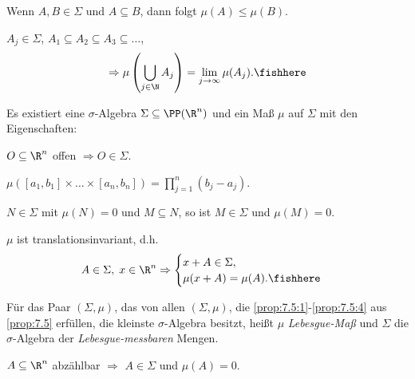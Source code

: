 \begin{cor}
\label{prop:7.4}
\begin{propenum}
\item Wenn $A,B\in\Sigma$ und $A\subseteq B$, dann folgt $\mu(A)\le\mu(B)$.
\item $A_j\in\Sigma$, $A_1\subseteq A_2\subseteq A_3 \subseteq \ldots$,
\begin{align*}
\Rightarrow \mu\left(\bigcup_{j\in\N} A_j\right) = \lim\limits_{j\to\infty}
\mu(A_j).\fishhere
\end{align*}
\end{propenum}
\end{cor}

\begin{prop}
\label{prop:7.5}
Es existiert eine $\sigma$-Algebra $\Sigma\subseteq \PP(\R^n)$ und ein Maß
$\mu$ auf $\Sigma$ mit den Eigenschaften:
\begin{propenum}
\item\label{prop:7.5:1} $O\subseteq\R^n$ offen $\Rightarrow O\in\Sigma$.
\item\label{prop:7.5:2} $\mu\left([a_1,b_1]\times \ldots \times [a_n,b_n]\right)
=\prod_{j=1}^n (b_j-a_j)$.
\item\label{prop:7.5:3} $N\in\Sigma$ mit $\mu(N) = 0$ und $M\subseteq N$, so ist
$M\in\Sigma$ und $\mu(M) = 0$.
\item\label{prop:7.5:4} $\mu$ ist translationsinvariant, d.h.
\begin{align*}
A\in\Sigma,\; x\in\R^n \Rightarrow
\begin{cases}
x+A\in\Sigma,\\
\mu(x+A) =\mu(A).\fishhere
\end{cases}
\end{align*}
\end{propenum}
\end{prop}

\begin{defn}
\label{defn:7.6}
Für das Paar $(\Sigma,\mu)$, das von allen $(\Sigma,\mu)$, die
\ref{prop:7.5:1}-\ref{prop:7.5:4} aus \ref{prop:7.5} erfüllen, die kleinste
$\sigma$-Algebra besitzt, heißt $\mu$ \emph{Lebesgue-Maß} und $\Sigma$ die
$\sigma$-Algebra der \emph{Lebesgue-messbaren} Mengen.\fishhere
\end{defn}

\begin{bem}
\label{bem:7.7}
$A\subseteq\R^n$ abzählbar $\Rightarrow$ $A\in\Sigma$ und $\mu(A) = 0$.\maphere
\end{bem}


